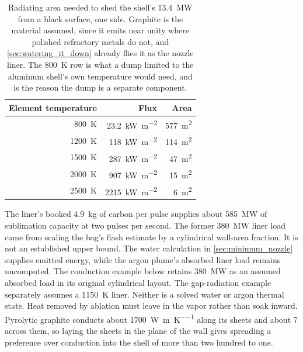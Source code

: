\documentclass{article}
\begin{document}
\begin{table}[!htpb]
    \centering
    \caption{Radiating area needed to shed the shell's \SI{13.4}{\mega\watt} from a black surface, one side. Graphite is the material assumed, since it emits near unity where polished refractory metals do not, and \autoref{sec:watering_it_down} already flies it as the nozzle liner. The \SI{800}{\kelvin} row is what a dump limited to the aluminum shell's own temperature would need, and is the reason the dump is a separate component.}
    \label{tab:argon_dump}
    \begin{tabular}{|r|r|r|}\hline
        \textbf{Element temperature} & \textbf{Flux} & \textbf{Area} \\\hline
        \SI{800}{\kelvin} & \SI{23.2}{\kilo\watt\per\square\meter} & \SI{577}{\square\meter} \\\hline
        \SI{1200}{\kelvin} & \SI{118}{\kilo\watt\per\square\meter} & \SI{114}{\square\meter} \\\hline
        \SI{1500}{\kelvin} & \SI{287}{\kilo\watt\per\square\meter} & \SI{47}{\square\meter} \\\hline
        \SI{2000}{\kelvin} & \SI{907}{\kilo\watt\per\square\meter} & \SI{15}{\square\meter} \\\hline
        \SI{2500}{\kelvin} & \SI{2215}{\kilo\watt\per\square\meter} & \SI{6}{\square\meter} \\\hline
    \end{tabular}
\end{table}

The liner's booked \SI{4.9}{\kilogram} of carbon per pulse supplies about \SI{585}{\mega\watt} of sublimation capacity at two pulses per second. The former \SI{380}{\mega\watt} liner load came from scaling the bag's flash estimate by a cylindrical wall-area fraction. It is not an established upper bound. The water calculation in \autoref{sec:minimum_nozzle} supplies emitted energy, while the argon plume's absorbed liner load remains uncomputed. The conduction example below retains \SI{380}{\mega\watt} as an assumed absorbed load in its original cylindrical layout. The gap-radiation example separately assumes a \SI{1150}{\kelvin} liner. Neither is a solved water or argon thermal state. Heat removed by ablation must leave in the vapor rather than soak inward. Pyrolytic graphite conducts about \SI{1700}{\watt\per\meter\per\kelvin} along its sheets and about \SI{7}{} across them, so laying the sheets in the plane of the wall gives spreading a preference over conduction into the shell of more than two hundred to one.
\end{document}
